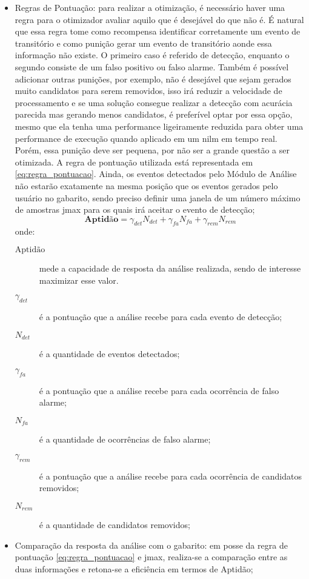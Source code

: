 \begin{itemize}
\item Regras de Pontuação: para realizar a otimização, é necessário
haver uma regra para o otimizador avaliar aquilo que é desejável do
que não é. É natural que essa regra tome como recompensa identificar
corretamente um evento de transitório e como punição gerar um evento
de transitório aonde essa informação não existe. O primeiro caso é
referido de detecção, enquanto o segundo consiste de um falso positivo
ou falso alarme. Também é possível adicionar outras punições, por
exemplo, não é desejável que sejam gerados muito candidatos para serem
removidos, isso irá reduzir a velocidade de processamento e se uma
solução consegue realizar a detecção com acurácia parecida mas gerando
menos candidatos, é preferível optar por essa opção, mesmo que ela
tenha uma performance ligeiramente reduzida para obter uma performance
de execução quando aplicado em um \gls{nilm} em tempo real.
Porém, essa punição deve ser pequena, por não ser a grande questão a
ser otimizada. A regra de pontuação utilizada está representada em
\ref{eq:regra_pontuacao}. Ainda, os eventos detectados pelo Módulo de
Análise não estarão exatamente na mesma posição que os eventos gerados
pelo usuário no gabarito, sendo preciso definir uma janela de um
número máximo de amostras \acs{jmax} para os quais irá aceitar o
evento de detecção;
\begin{equation}\label{eq:regra_pontuacao}
\textbf{Aptidão}=\gamma_{det}N_{det}+\gamma_{fa}N_{fa}+\gamma_{rem}N_{rem}
\end{equation}
\noindent onde:
\begin{description}
\item[$\text{Aptidão}$] mede a capacidade de resposta da análise realizada,
sendo de interesse maximizar esse valor.
\item[$\gamma_{det}$] é a pontuação que a análise recebe para cada
evento de detecção;
\item[$N_{det}$] é a quantidade de eventos detectados;
\item[$\gamma_{fa}$] é a pontuação que a análise recebe para cada
ocorrência de falso alarme;
\item[$N_{fa}$] é a quantidade de ocorrências de falso alarme;
\item[$\gamma_{rem}$] é a pontuação que a análise recebe para cada
ocorrência de candidatos removidos;
\item[$N_{rem}$] é a quantidade de candidatos removidos;
\end{description}

\item Comparação da resposta da análise com o gabarito: em posse da
regra de pontuação \ref{eq:regra_pontuacao} e \acs{jmax}, realiza-se a
comparação entre as duas informações e retona-se a eficiência em termos
de Aptidão;


\end{itemize}
